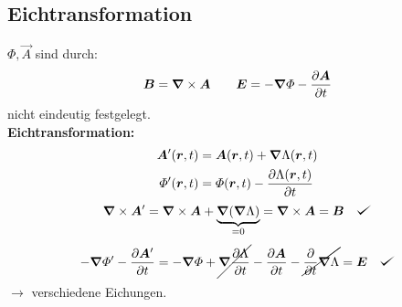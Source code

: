 \subsection{Eichtransformation}

$ \Phi, \vec{A} $ sind durch:
\begin{equation*}
\bm{B} = \bm{\nabla} \times \bm{A} \qquad \bm{E} = - \bm{\nabla} \varPhi - \frac{\partial \bm{A}}{\partial t}
\end{equation*}
nicht eindeutig festgelegt.\\[5pt]
\textbf{Eichtransformation:}
\begin{align*}
\bm{A}'(\bm{r},t) &= \bm{A}(\bm{r},t) + \bm{\nabla} \Lambda(\bm{r},t)\\
\varPhi'(\bm{r},t) &= \varPhi(\bm{r},t) - \frac{\partial \Lambda(\bm{r},t)}{\partial t}
\end{align*}
\begin{equation*}
\vabla \times \vec{A}' = \vabla \times \vec{A} + \ub{ \vabla (\vabla \Lambda)}_{=0} = \vabla \times \vec{A} = \vec{B} \quad \checkmark
\end{equation*}
\begin{equation*}
- \vabla \Phi' - \prt{\vec{A}'}{t} = - \vabla \Phi + \cancel{\vabla \prt{\Lambda}{t}} - \prt{\vec{A}}{t} - \cancel{\prt{}{t} \vabla \Lambda} = \vec{E} \quad \checkmark 
\end{equation*}
$ \rightarrow $ verschiedene Eichungen.
